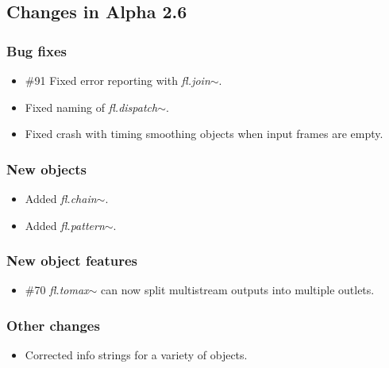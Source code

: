 \documentclass{article}
\newcommand{\flobject}[1]{\textit{fl.#1$\sim$}}
\begin{document}
\subsection{Changes in Alpha 2.6}
\vspace{0.1in}

\subsubsection{Bug fixes}

\begin{itemize}

\item {\#91} Fixed error reporting with \flobject{join}.
\item Fixed naming of \flobject{dispatch}.
\item Fixed crash with timing smoothing objects when input frames are empty.
\end{itemize}

\subsubsection{New objects}

\begin{itemize}
\item Added \flobject{chain}.
\item Added \flobject{pattern}.
\end{itemize}

\subsubsection{New object features}

\begin{itemize}
\item {\#70} \flobject{tomax} can now split multistream outputs into multiple outlets.
\end{itemize}

\subsubsection{Other changes}

\begin{itemize}
\item Corrected info strings for a variety of objects.
\end{itemize}
\end{document}
